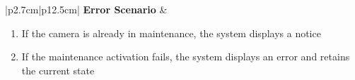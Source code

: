 \begin{table}[H]
\begin{tabular}{|p{2.7cm}|p{12.5cm}|}
        \hline
        \textbf{Error Scenario} & \begin{minipage}[t]{\linewidth}
                                      \begin{enumerate}[topsep=0pt,itemsep=1pt,parsep=0pt,partopsep=0pt]
                                          \item If the camera is already in maintenance, the system displays a notice
                                          \item If the maintenance activation fails, the system displays an error and retains
                                                the current state
                                      \end{enumerate}
                                  \end{minipage} \\
        \hline
    \end{tabular}
    \label{tab:admin-enable-camera-maintenance}
\end{table}
